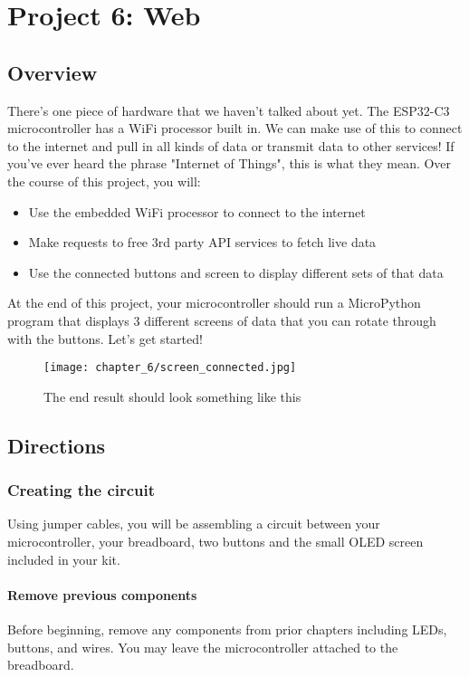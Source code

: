 \chapter{Project 6: Web}

\section{Overview}
There's one piece of hardware that we haven't talked about yet. The ESP32-C3 microcontroller has a
WiFi processor built in. We can make use of this to connect to the internet and pull in all kinds of
data or transmit data to other services! If you've ever heard the phrase "Internet of Things", this
is what they mean. Over the course of this project, you will:
\begin{itemize}
    \item Use the embedded WiFi processor to connect to the internet
    \item Make requests to free 3rd party API services to fetch live data
    \item Use the connected buttons and screen to display different sets of that data
\end{itemize}
At the end of this project, your microcontroller should run a MicroPython program that displays 3
different screens of data that you can rotate through with the buttons. Let's get started!
\begin{figure}[H]
\centering
    \texttt{[image: chapter\_6/screen\_connected.jpg]}
    \caption{The end result should look something like this}
\end{figure}

\pagebreak

\section{Directions}

\subsection{Creating the circuit}
Using jumper cables, you will be assembling a circuit between your microcontroller, your breadboard, two
buttons and the small OLED screen included in your kit.

\subsubsection{Remove previous components}
Before beginning, remove any components from prior chapters including LEDs, buttons, and wires. You may leave the
microcontroller attached to the breadboard.

